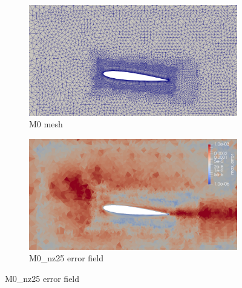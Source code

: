 \begin{figure}[H]
\centering

\begin{subfigure}[b]{0.475\textwidth}
\centering
\includegraphics[width=1\textwidth]{figures/zonal_adapt_results/Mesh_and_error_plots/M0_inplane.png}
\caption{M0 mesh}
\label{fig:zonal_M0_mesh}
\end{subfigure}
\begin{subfigure}[b]{0.475\textwidth}
\centering
\includegraphics[width=1\textwidth]{figures/zonal_adapt_results/Mesh_and_error_plots/M0_error.png}
\caption{M0\_nz25 error field}
\label{fig:zonal_M0_error}
\end{subfigure}


\end{figure}
